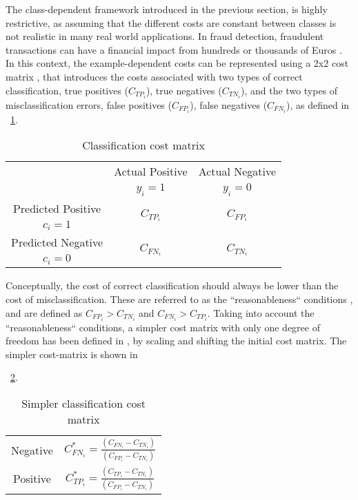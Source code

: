 {The class-dependent framework introduced in the previous section, is highly restrictive, as 
assuming that the different costs are constant between classes is not realistic in many real world 
applications. In fraud detection, fraudulent transactions  can have a financial impact from 
hundreds or thousands of Euros \cite{Sahin2013}. 
In this context, the example-dependent costs can be represented using a 2x2 cost matrix 
\citep{Elkan2001}, that introduces the costs associated with   two types of correct   
classification, true positives ($C_{TP_i}$), true negatives ($C_{TN_i}$),   and the two  types of  
 misclassification errors, false positives ($C_{FP_i}$), false negatives   ($C_{FN_i}$), as   
defined in \tablename{~\ref{tab:3:cost_matrix}}.

\begin{table}[t]
    \centering
    \footnotesize
    \begin{tabular}{c|c|c}
      \multicolumn{1}{c|}{}  & Actual Positive& Actual Negative \\
      \multicolumn{1}{c|}{} & $y_i=1$& $y_i=0$ \\
      \hline
      Predicted Positive    & \multirow{ 2}{*}{$C_{TP_i}$} & \multirow{ 2}{*}{$C_{FP_i}$} \\
      $c_i=1$ & &\\
      \hline
      Predicted Negative    & \multirow{ 2}{*}{$C_{FN_i}$} & \multirow{ 2}{*}{$C_{TN_i}$} \\
      $c_i=0$ & &\\
    \end{tabular}
    \caption{Classification cost matrix}
    \label{tab:3:cost_matrix}
\end{table}  

Conceptually, the cost of correct classification should always be lower than the cost of  
misclassification. These are referred to as the ``reasonableness`` conditions \citep{Elkan2001},   
and are defined as  $C_{FP_i} > C_{TN_i}$ and $C_{FN_i} > C_{TP_i}$.  Taking into account the 
``reasonableness`` conditions, a simpler cost matrix   with only one degree of freedom has been 
defined in \citep{Elkan2001}, by scaling and shifting the initial cost matrix. The simpler
cost-matrix is shown in \tablename{~\ref{tab:3:sim_cost_mat}.
  
\begin{table}[t]
  \centering
  \footnotesize    \begin{tabular}{c|c}
  \multirow{ 2}{*}{Negative} & \multirow{ 
  2}{*}{$C^*_{FN_i}=\frac{(C_{FN_i}-C_{TN_i})}{(C_{FP_i}-C_{TN_i})}$} \\
  \\
  \hline
  \multirow{ 2}{*}{Positive} & \multirow{ 
  2}{*}{$C^*_{TP_i}=\frac{(C_{TP_i}-C_{TN_i})}{(C_{FP_i}-C_{TN_i})}$} \\
  \\ 
  \end{tabular}
  \caption{Simpler classification cost matrix \citep{Elkan2001}}
  \label{tab:3:sim_cost_mat}
\end{table}  

}}
